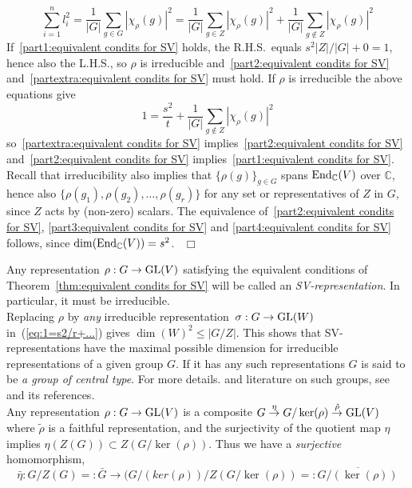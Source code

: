 \documentclass[12pt]{article}
\newcommand{\bbC}{\ensuremath{\mathbb{C}}}\newcommand{\bbCp}{\ensuremath{\mathbb{C}_p}}
\newcommand{\End}{{\rm End}}
\newcommand{\ePf}{~$\Box$\vertsp\par}%
\newcommand{\GL}{{\rm GL}}
\renewcommand{\rem}{\refstepcounter{rem}\noindent{\sc Remark \therem}}
\renewcommand{\t}[1]{\tilde{#1}}
\renewcommand{\therem}{\thesection.\arabic{rem}}
\newcommand{\vertsp}{\vspace{1ex}}
\newcommand{\rep}{representation\ }
\begin{document}
$$
\sum_{i=1}^n l_i^2 = 
\frac{1}{|G|}\sum_{g\in G} |\chi_\rho(g)|^2=
\frac{1}{|G|}\sum_{g\in Z} |\chi_\rho(g)|^2+
\frac{1}{|G|}\sum_{g\nin Z} |\chi_\rho(g)|^2
$$
If~\ref{part1:equivalent condits for SV} holds, the R.H.S.\ equals $s^2 |Z|/|G|+0=1$, hence also the L.H.S., so $\rho$ is irreducible and~\ref{part2:equivalent condits for SV} and~\ref{partextra:equivalent condits for SV} must hold. 
If $\rho$ is irreducible the above equations give
\begin{equation}\label{eq:1=s2/r+...}
	1=\frac{s^2}{t}+
	\frac{1}{|G|}\sum_{g\nin Z} |\chi_\rho(g)|^2
\end{equation}
so~\ref{partextra:equivalent condits for SV} implies~\ref{part2:equivalent condits for SV} and~\ref{part2:equivalent condits for SV} implies~\ref{part1:equivalent condits for SV}. 
Recall that irreducibility also implies that 
$\{\rho(g)\}_{g\in G}$ spans $\End_\bbC(V)$ over $\bbC$, hence also  $\{\rho(g_1), \rho(g_2),\ldots ,\rho(g_r)\}$ for any set or representatives of $Z$ in $G$, since $Z$ acts by (non-zero) scalars. The equivalence of~\ref{part2:equivalent condits for SV}, \ref{part3:equivalent condits for SV} and \ref{part4:equivalent condits for SV} follows, since $\dim(\End_\bbC(V))=s^2$.
\ePf
\noindent Any representation $\rho:G\rightarrow \GL(V)$ satisfying the equivalent conditions of Theorem~\ref{thm:equivalent condits for SV} will be called an {\em SV-representation}.  In particular, it must be irreducible. %
\bigskip\\
\rem\label{rem: SV reps have maximal dimension}  Replacing $\rho$ by \textit{any} irreducible \rep  $\sigma:G\rightarrow \GL(W)$ in~(\ref{eq:1=s2/r+...}) gives $\dim(W)^2\leq |G/Z|$. This shows that SV-representations have the maximal possible dimension for irreducible representations of a given group $G$. If it has any such representations $G$  is said to be \textit{a group of central type}. For more details. 
and literature on such groups, see~\cite{Howe} and its references. 
\bigskip\\
Any representation $\rho:G\rightarrow \GL(V)$ is a composite 
$
G
\stackrel{\eta}{\rightarrow}G/\ker(\rho)\stackrel{\t \rho}{\rightarrow}\GL(V)
$
where $\t \rho$ is a faithful representation, and the surjectivity of the quotient map $\eta$ implies 
$
\eta(Z(G))\subset Z(G/\ker(\rho))
$. Thus we have a \textit{surjective} homomorphism, 
$$
\bar \eta : G/Z(G)=:\bar G \longrightarrow(G/(ker(\rho))/Z(G/\ker(\rho))=:\overline{G/(\ker(\rho))}
$$
\end{document}
